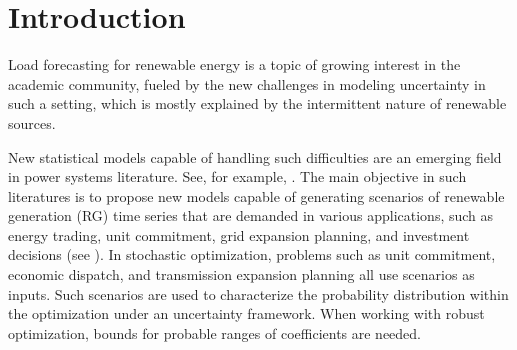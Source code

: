 \section{Introduction} \label{sec:introduction}


Load forecasting for renewable energy is a topic of growing interest in the academic community, fueled by the new challenges in modeling uncertainty in such a setting, which is mostly explained by the intermittent nature of renewable sources.    %


New statistical models capable of handling such difficulties are an emerging field in power systems literature. See, for example, \cite{bessa2012time, gallego2016line,moller_time-adaptive_2008,nielsen2006,bremnes_probabilistic_2004,wan_direct_2017}. 
The main objective in such literatures is to propose new models capable of generating scenarios of renewable generation (RG) time series that are demanded in various applications, such as energy trading, unit commitment,  grid expansion planning, and investment decisions (see \cite{moreiraStreet,jabr2013robust,zhaoguan,Aderson2017}). 
In stochastic optimization, problems such as unit commitment, economic dispatch, and transmission expansion planning all use scenarios as inputs. 
Such scenarios are used to characterize the probability distribution within the optimization under an uncertainty framework.
When working with robust optimization, bounds for probable ranges of coefficients are needed.

 
